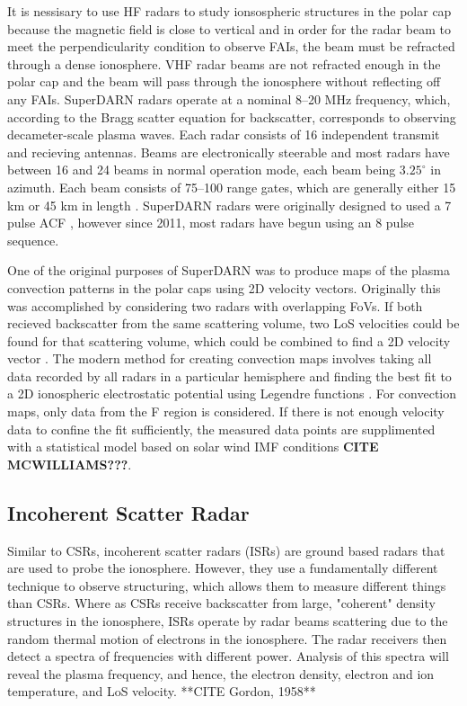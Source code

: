 It is nessisary to use HF radars to study ionsospheric structures in the polar cap because the magnetic field is close to vertical and in order for the radar beam to meet the perpendicularity condition to observe FAIs, the beam must be refracted through a dense ionosphere.  VHF radar beams are not refracted enough in the polar cap and the beam will pass through the ionosphere without reflecting off any FAIs.  SuperDARN radars operate at a nominal 8--20 MHz frequency, which, according to the Bragg scatter equation for backscatter, corresponds to observing decameter-scale plasma waves.  Each radar consists of 16 independent transmit and recieving antennas.  Beams are electronically steerable and most radars have between 16 and 24 beams in normal operation mode, each beam being \(3.25^\circ\) in azimuth.  Each beam consists of 75--100 range gates, which are generally either 15 km or 45 km in length \citep{Chisham2007}.  SuperDARN radars were originally designed to used a 7 pulse ACF \citep{Farley1972,Greenwald1983,Greenwald1985}, however since 2011, most radars have begun using an 8 pulse sequence.

One of the original purposes of SuperDARN was to produce maps of the plasma convection patterns in the polar caps using 2D velocity vectors.  Originally this was accomplished by considering two radars with overlapping FoVs.  If both recieved backscatter from the same scattering volume, two LoS velocities could be found for that scattering volume, which could be combined to find a 2D velocity vector \citep{Ruohoniemi1989}.  The modern method for creating convection maps involves taking all data recorded by all radars in a particular hemisphere and finding the best fit to a 2D ionospheric electrostatic potential using Legendre functions \citep{Ruohonomiemi1998}.  For convection maps, only data from the F region is considered.  If there is not enough velocity data to confine the fit sufficiently, the measured data points are supplimented with a statistical model based on solar wind IMF conditions \textbf{CITE MCWILLIAMS???}.


\subsection{Incoherent Scatter Radar}
Similar to CSRs, incoherent scatter radars (ISRs) are ground based radars that are used to probe the ionosphere.  However, they use a fundamentally different technique to observe structuring, which allows them to measure different things than CSRs.  Where as CSRs receive backscatter from large, "coherent" density structures in the ionosphere, ISRs operate by radar beams scattering due to the random thermal motion of electrons in the ionosphere.  The radar receivers then detect a spectra of frequencies with different power.  Analysis of this spectra will reveal the plasma frequency, and hence, the electron density, electron and ion temperature, and LoS velocity.
**CITE Gordon, 1958**

